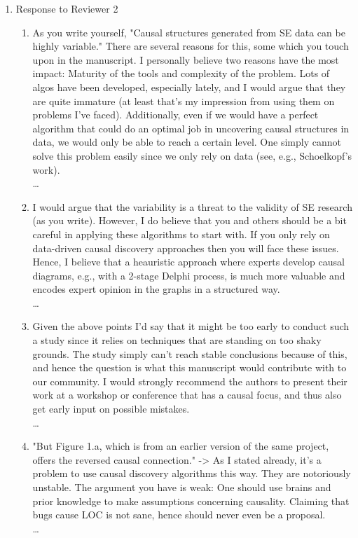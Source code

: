 \documentclass[]{svjour3}
\begin{document}
\begin{enumerate}
\begin{enumerate}
    \end{enumerate}
    \item Response to Reviewer 2
    \begin{enumerate}
        \item As you write yourself, "Causal structures generated from SE data can be highly variable." There are several reasons for this, some which you touch upon in the manuscript. I personally believe two reasons have the most impact: Maturity of the tools and complexity of the problem. Lots of algos have been developed, especially lately, and I would argue that they are quite immature (at least that's my impression from using them on problems I've faced). Additionally, even if we would have a perfect algorithm that could do an optimal job in uncovering causal structures in data, we would only be able to reach a certain level. One simply cannot solve this problem easily since we only rely on data (see, e.g., Schoelkopf's work).\\{\MARK \dots}
        \item I would argue that the variability is a threat to the validity of SE research (as you write). However, I do believe that you and others should be a bit careful in applying these algorithms to start with. If you only rely on data-driven causal discovery approaches then you will face these issues. Hence, I believe that a heauristic approach where experts develop causal diagrams, e.g., with a 2-stage Delphi process, is much more valuable and encodes expert opinion in the graphs in a structured way.\\{\MARK \dots}
        \item Given the above points I'd say that it might be too early to conduct such a study since it relies on techniques that are standing on too shaky grounds. The study simply can't reach stable conclusions because of this, and hence the question is what this manuscript would contribute with to our community. I would strongly recommend the authors to present their work at a workshop or conference that has a causal focus, and thus also get early input on possible mistakes.\\{\MARK \dots}
        \item "But Figure 1.a, which is from an earlier version of the same project, offers the reversed causal connection." -> As I stated already, it's a problem to use causal discovery algorithms this way. They are notoriously unstable. The argument you have is weak: One should use brains and prior knowledge to make assumptions concerning causality. Claiming that bugs cause LOC is not sane, hence should never even be a proposal.\\{\MARK \dots}

\end{enumerate}
\end{enumerate}
\end{document}
